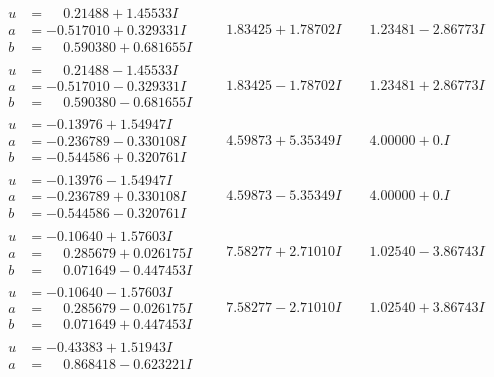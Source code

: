 \documentclass[1p]{elsarticle_modified}
\theoremstyle{definition}
\begin{document}
$$\begin{array}{c|c|c}
\begin{aligned}
u &= \phantom{-}0.21488 + 1.45533 I \\
a &= -0.517010 + 0.329331 I \\
b &= \phantom{-}0.590380 + 0.681655 I\end{aligned}
 & \phantom{-}1.83425 + 1.78702 I & \phantom{-}1.23481 - 2.86773 I \\ \hline\begin{aligned}
u &= \phantom{-}0.21488 - 1.45533 I \\
a &= -0.517010 - 0.329331 I \\
b &= \phantom{-}0.590380 - 0.681655 I\end{aligned}
 & \phantom{-}1.83425 - 1.78702 I & \phantom{-}1.23481 + 2.86773 I \\ \hline\begin{aligned}
u &= -0.13976 + 1.54947 I \\
a &= -0.236789 - 0.330108 I \\
b &= -0.544586 + 0.320761 I\end{aligned}
 & \phantom{-}4.59873 + 5.35349 I & \phantom{-}4.00000 + 0. I\phantom{ +0.000000I} \\ \hline\begin{aligned}
u &= -0.13976 - 1.54947 I \\
a &= -0.236789 + 0.330108 I \\
b &= -0.544586 - 0.320761 I\end{aligned}
 & \phantom{-}4.59873 - 5.35349 I & \phantom{-}4.00000 + 0. I\phantom{ +0.000000I} \\ \hline\begin{aligned}
u &= -0.10640 + 1.57603 I \\
a &= \phantom{-}0.285679 + 0.026175 I \\
b &= \phantom{-}0.071649 - 0.447453 I\end{aligned}
 & \phantom{-}7.58277 + 2.71010 I & \phantom{-}1.02540 - 3.86743 I \\ \hline\begin{aligned}
u &= -0.10640 - 1.57603 I \\
a &= \phantom{-}0.285679 - 0.026175 I \\
b &= \phantom{-}0.071649 + 0.447453 I\end{aligned}
 & \phantom{-}7.58277 - 2.71010 I & \phantom{-}1.02540 + 3.86743 I \\ \hline\begin{aligned}
u &= -0.43383 + 1.51943 I \\
a &= \phantom{-}0.868418 - 0.623221 I \\

\end{aligned}
\end{array}$$
\end{document}

